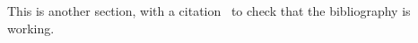 This is another section, with a citation~\cite{Deligne2018} to check that the bibliography is working.